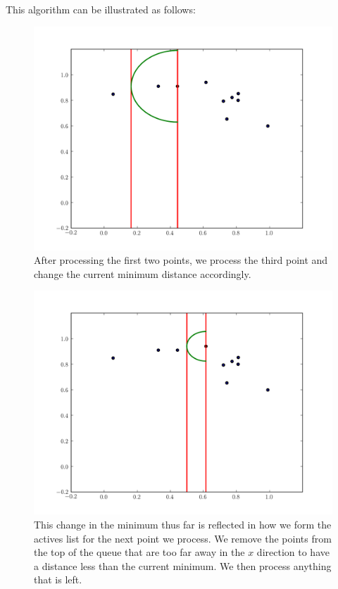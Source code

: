 This algorithm can be illustrated as follows:
\begin{figure}[H]
\includegraphics[width = .8\textwidth]{simple0.pdf}
\caption{After processing the first two points, we process the third point and change the current minimum distance accordingly.}
\end{figure}

\begin{figure}[H]
\includegraphics[width = .8\textwidth]{simple1.pdf}
\caption{This change in the minimum thus far is reflected in how we form the actives list for the next point we process. 
We remove the points from the top of the queue that are too far away in the $x$ direction to have a distance less than the current minimum. 
We then process anything that is left.}
\end{figure}

